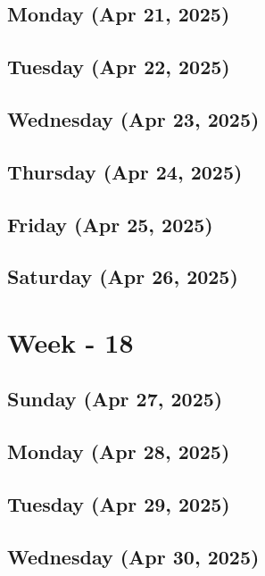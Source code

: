 \subsection*{Monday (Apr 21, 2025)}
\subsection*{Tuesday (Apr 22, 2025)}
\subsection*{Wednesday (Apr 23, 2025)}
\subsection*{Thursday (Apr 24, 2025)}
\subsection*{Friday (Apr 25, 2025)}
\subsection*{Saturday (Apr 26, 2025)}

\section{Week - 18}
\subsection*{Sunday (Apr 27, 2025)}
\subsection*{Monday (Apr 28, 2025)}
\subsection*{Tuesday (Apr 29, 2025)}
\subsection*{Wednesday (Apr 30, 2025)}



\newpage
\begin{spacing}{1.0}
\renewcommand{\bibname}{\bf{References}}


\end{spacing}